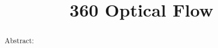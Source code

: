 \documentclass[a4paper,11pt,twoside]{report}
\title{360 Optical Flow}
\begin{document}
\maketitle

\tableofcontents

\begin{abstract}
Abstract: 
\end{abstract}















\end{document}
